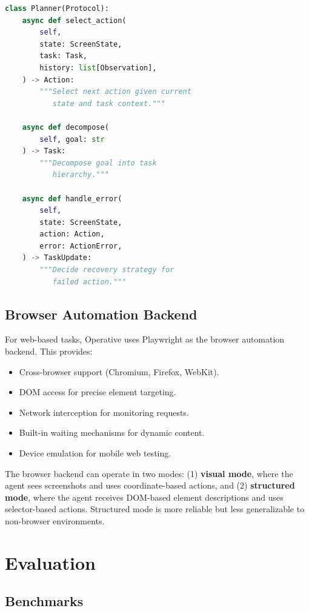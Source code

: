\documentclass[11pt,twocolumn]{article}
\begin{document}
\begin{lstlisting}[language=Python, caption=Planner protocol]
class Planner(Protocol):
    async def select_action(
        self,
        state: ScreenState,
        task: Task,
        history: list[Observation],
    ) -> Action:
        """Select next action given current
           state and task context."""

    async def decompose(
        self, goal: str
    ) -> Task:
        """Decompose goal into task
           hierarchy."""

    async def handle_error(
        self,
        state: ScreenState,
        action: Action,
        error: ActionError,
    ) -> TaskUpdate:
        """Decide recovery strategy for
           failed action."""
\end{lstlisting}

\subsection{Browser Automation Backend}

For web-based tasks, Operative uses Playwright as the browser automation backend. This provides:

\begin{itemize}[leftmargin=*]
    \item Cross-browser support (Chromium, Firefox, WebKit).
    \item DOM access for precise element targeting.
    \item Network interception for monitoring requests.
    \item Built-in waiting mechanisms for dynamic content.
    \item Device emulation for mobile web testing.
\end{itemize}

The browser backend can operate in two modes: (1) \textbf{visual mode}, where the agent sees screenshots and uses coordinate-based actions, and (2) \textbf{structured mode}, where the agent receives DOM-based element descriptions and uses selector-based actions. Structured mode is more reliable but less generalizable to non-browser environments.

\section{Evaluation}
\label{sec:evaluation}

\subsection{Benchmarks}
\end{document}
